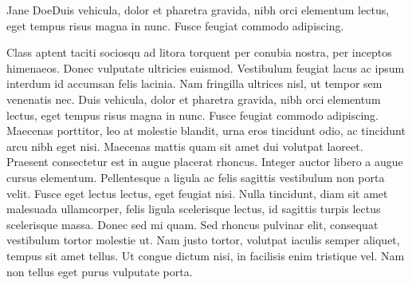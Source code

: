 \begin{dialogue}{Jane Doe}{Duis vehicula, dolor et pharetra gravida, nibh orci elementum lectus, eget tempus risus magna in nunc. Fusce feugiat commodo adipiscing. }\end{dialogue}

Class aptent taciti sociosqu ad litora torquent per conubia nostra, per inceptos himenaeos. Donec vulputate ultricies euismod. Vestibulum feugiat lacus ac ipsum interdum id accumsan felis lacinia. Nam fringilla ultrices nisl, ut tempor sem venenatis nec. Duis vehicula, dolor et pharetra gravida, nibh orci elementum lectus, eget tempus risus magna in nunc. Fusce feugiat commodo adipiscing. Maecenas porttitor, leo at molestie blandit, urna eros tincidunt odio, ac tincidunt arcu nibh eget nisi. Maecenas mattis quam sit amet dui volutpat laoreet. Praesent consectetur est in augue placerat rhoncus. Integer auctor libero a augue cursus elementum. Pellentesque a ligula ac felis sagittis vestibulum non porta velit. Fusce eget lectus lectus, eget feugiat nisi. Nulla tincidunt, diam sit amet malesuada ullamcorper, felis ligula scelerisque lectus, id sagittis turpis lectus scelerisque massa. Donec sed mi quam. Sed rhoncus pulvinar elit, consequat vestibulum tortor molestie ut. Nam justo tortor, volutpat iaculis semper aliquet, tempus sit amet tellus. Ut congue dictum nisi, in facilisis enim tristique vel. Nam non tellus eget purus vulputate porta. 


